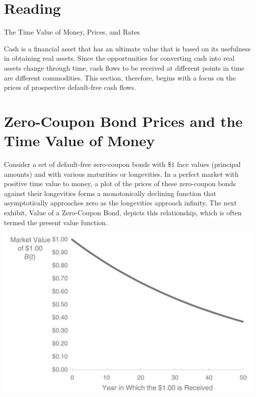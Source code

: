 \documentclass[11pt]{article}
\begin{document}
\section*{Reading}
The Time Value of Money, Prices, and Rates

Cash is a financial asset that has an ultimate value that is based on its usefulness in obtaining real assets. Since the opportunities for converting cash into real assets change through time, cash flows to be received at different points in time are different commodities. This section, therefore, begins with a focus on the prices of prospective default-free cash flows.

\section*{Zero-Coupon Bond Prices and the Time Value of Money}
Consider a set of default-free zero-coupon bonds with $\$ 1$ face values (principal amounts) and with various maturities or longevities. In a perfect market with positive time value to money, a plot of the prices of these zero-coupon bonds against their longevities forms a monotonically declining function that asymptotically approaches zero as the longevities approach infinity. The next exhibit, Value of a Zero-Coupon Bond, depicts this relationship, which is often termed the present value function.

\begin{center}
\includegraphics[max width=\textwidth]{2024_04_10_58b17af8323992df0cbag-2}
\end{center}
\end{document}
